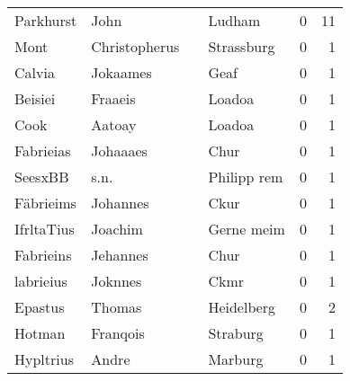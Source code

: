 \begin{tabular}{llllrr}
                Parkhurst &                               John &             &                                      Ludham &          0 &        11 \\
                     Mont &                      Christopherus &             &                                  Strassburg &          0 &         1 \\
                   Calvia &                           Jokaames &             &                                        Geaf &          0 &         1 \\
                  Beisiei &                            Fraaeis &             &                                      Loadoa &          0 &         1 \\
                     Cook &                             Aatoay &             &                                      Loadoa &          0 &         1 \\
                Fabrieias &                           Johaaaes &             &                                        Chur &          0 &         1 \\
                  SeesxBB &                               s.n. &             &                                 Philipp rem &          0 &         1 \\
                Fäbrieims &                           Johannes &             &                                        Ckur &          0 &         1 \\
               IfrltaTius &                            Joachim &             &                                  Gerne meim &          0 &         1 \\
                Fabrieins &                           Jehannes &             &                                        Chur &          0 &         1 \\
                labrieius &                            Joknnes &             &                                        Ckmr &          0 &         1 \\
                  Epastus &                             Thomas &             &                                  Heidelberg &          0 &         2 \\
                   Hotman &                           Franqois &             &                                    Straburg &          0 &         1 \\
                Hypltrius &                              Andre &             &                                     Marburg &          0 &         1 \\

\end{tabular}
